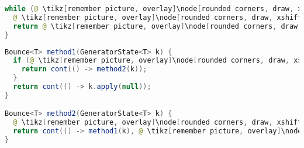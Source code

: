 \begin{center}
\begin{mdframed}[topline=true]
\begin{minipage}[t]{0.4\textwidth}
\begin{lstlisting}[language=Java, numbers=none, breaklines=true]
while (@ \tikz[remember picture, overlay]\node[rounded corners, draw, xshift=-0.1cm, inner sep=5pt, anchor=west, yshift=0.1cm] {Feltétel}; \vspace*{0.3cm} \hspace*{1.14cm}@) {
  @ \tikz[remember picture, overlay]\node[rounded corners, draw, xshift=-0.1cm, inner sep=5pt, anchor=west] {Kódrészlet}; \vspace*{0.5cm} @ 
  return @ \tikz[remember picture, overlay]\node[rounded corners, draw, xshift=-0.1cm, inner sep=5pt, anchor=west, yshift=0.1cm] {Kifejezés}; \vspace*{0.3cm} @
}
\end{lstlisting}
\end{minipage} 
\begin{minipage}[t]{0.6\textwidth}
\begin{lstlisting}[language=Java, numbers=none, breaklines=true, aboveskip=1em]
Bounce<T> method1(GeneratorState<T> k) {
  if (@ \tikz[remember picture, overlay]\node[rounded corners, draw, xshift=-0.1cm, inner sep=5pt, anchor=west, yshift=0.1cm] {Feltétel}; \hspace*{1.04cm} @) {
    return cont(() -> method2(k));
  }
  return cont(() -> k.apply(null));
}

Bounce<T> method2(GeneratorState<T> k) {
  @ \tikz[remember picture, overlay]\node[rounded corners, draw, xshift=-0.1cm, inner sep=5pt, anchor=west] {Kódrészlet}; \vspace*{0.3cm} @
  return cont(() -> method1(k), @ \tikz[remember picture, overlay]\node[rounded corners, draw, xshift=-0.1cm, inner sep=5pt, anchor=west, yshift=0.1cm] {Kifejezés}; \vspace*{0.2cm} \hspace*{1.2cm} @);
}
\end{lstlisting} 
\end{minipage}
\end{mdframed}
\label{GenWhile}
\end{center}

